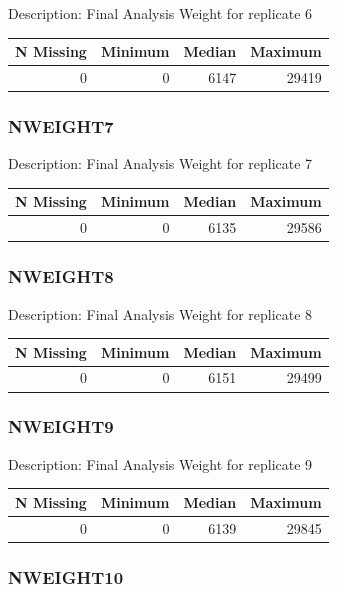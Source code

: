 \documentclass[
]{krantz}
\begin{document}
Description: Final Analysis Weight for replicate 6

\begin{tabular}[t]{r|r|r|r}
\hline
N Missing & Minimum & Median & Maximum\\
\hline
0 & 0 & 6147 & 29419\\
\hline
\end{tabular}

\hypertarget{nweight7}{%
\subsubsection*{NWEIGHT7}\label{nweight7}}


Description: Final Analysis Weight for replicate 7

\begin{tabular}[t]{r|r|r|r}
\hline
N Missing & Minimum & Median & Maximum\\
\hline
0 & 0 & 6135 & 29586\\
\hline
\end{tabular}

\hypertarget{nweight8}{%
\subsubsection*{NWEIGHT8}\label{nweight8}}


Description: Final Analysis Weight for replicate 8

\begin{tabular}[t]{r|r|r|r}
\hline
N Missing & Minimum & Median & Maximum\\
\hline
0 & 0 & 6151 & 29499\\
\hline
\end{tabular}

\hypertarget{nweight9}{%
\subsubsection*{NWEIGHT9}\label{nweight9}}


Description: Final Analysis Weight for replicate 9

\begin{tabular}[t]{r|r|r|r}
\hline
N Missing & Minimum & Median & Maximum\\
\hline
0 & 0 & 6139 & 29845\\
\hline
\end{tabular}

\hypertarget{nweight10}{%
\subsubsection*{NWEIGHT10}\label{nweight10}}
\end{document}
